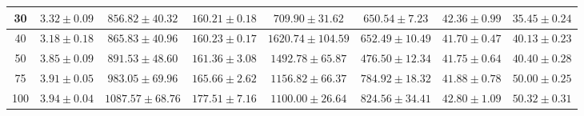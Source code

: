 \begin{table}
\begin{adjustwidth}{-2cm}{}
\begin{center}
\begin{tabular}{|c||c|c|c|c|c|c|c|}
\\
\hline 
 30  &$3.32\pm0.09$ & $856.82\pm40.32$  &  $160.21\pm0.18$  & $709.90\pm31.62$   &  $650.54\pm7.23$ &$42.36\pm0.99$ &  $35.45\pm0.24$  
\\
\hline
 40 & $3.18\pm0.18$ & $865.83\pm40.96$  &  $160.23\pm0.17$  & $1620.74\pm104.59$   &  $652.49\pm10.49$&$41.70\pm0.47$   &  $40.13\pm0.23$   
\\
\hline
 50  & $3.85\pm0.09$ & $891.53\pm48.60$  &  $161.36\pm3.08$  & $1492.78\pm65.87 $   &  $476.50\pm12.34$&$41.75\pm0.64$  &  $40.40\pm0.28$    
\\
\hline
 75  & $3.91\pm0.05$ & $983.05\pm69.96$  &  $165.66\pm2.62 $  & $1156.82\pm66.37$   &  $784.92\pm18.32$ &$41.88\pm0.78$ &  $50.00\pm0.25$  
\\
\hline
 100  & $3.94\pm0.04$ & $1087.57\pm68.76 $  &  $177.51\pm7.16$  & $1100.00\pm26.64$   &  $824.56\pm34.41$ &$42.80\pm1.09$ &  $50.32\pm0.31$    
\\
\hline
\end{tabular}
\end{center}
\end{adjustwidth}
\end{table}


